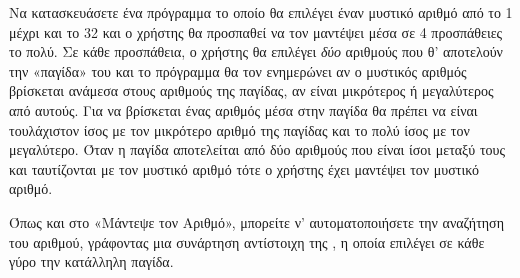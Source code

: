 \documentclass[a4paper,11pt,oneside]{book}
\begin{document}
\begin{exercise}
Να κατασκευάσετε ένα πρόγραμμα το οποίο θα επιλέγει έναν μυστικό αριθμό από το 1 μέχρι και το 32 και ο χρήστης θα προσπαθεί να τον μαντέψει μέσα σε 4 προσπάθειες το πολύ. Σε κάθε προσπάθεια, ο χρήστης θα επιλέγει \emph{δύο} αριθμούς που θ' αποτελούν την «παγίδα» του και το πρόγραμμα θα τον ενημερώνει αν ο μυστικός αριθμός βρίσκεται ανάμεσα στους αριθμούς της παγίδας, αν είναι μικρότερος ή μεγαλύτερος από αυτούς. Για να βρίσκεται ένας αριθμός μέσα στην παγίδα θα πρέπει να είναι τουλάχιστον ίσος με τον μικρότερο αριθμό της παγίδας και το πολύ ίσος με τον μεγαλύτερο.
Όταν η παγίδα αποτελείται από δύο αριθμούς που είναι ίσοι μεταξύ τους και ταυτίζονται με τον μυστικό αριθμό τότε ο χρήστης έχει μαντέψει τον μυστικό αριθμό. 

Όπως και στο «Μάντεψε τον Αριθμό», μπορείτε ν' αυτοματοποιήσετε την αναζήτηση του αριθμού, γράφοντας μια συνάρτηση αντίστοιχη της , η οποία επιλέγει σε κάθε γύρο την κατάλληλη παγίδα.
\end{exercise}
\end{document}
